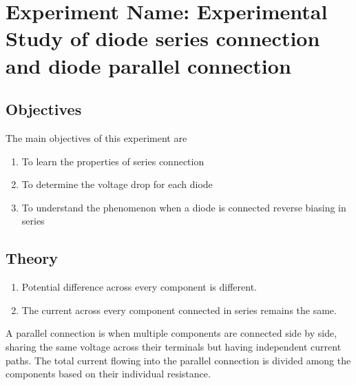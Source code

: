 

\chapter{Experiment Name: Experimental Study of diode series connection and diode parallel connection}
\label{exp1}


\section{Objectives}
The main objectives of this experiment are
\begin{enumerate}
    \item To learn the properties of series connection
    \item To determine the voltage drop for each diode
    \item To understand the phenomenon when a diode is connected reverse biasing in series
\end{enumerate}

\section{Theory}
\begin{enumerate}
    \item Potential difference across every component is different.
    \item The current across every component connected in series remains the same.
\end{enumerate}
A parallel connection is when multiple components are connected side by side, sharing
the same voltage across their terminals but having independent current paths. The total
current flowing into the parallel connection is divided among the components based on their
individual resistance.

